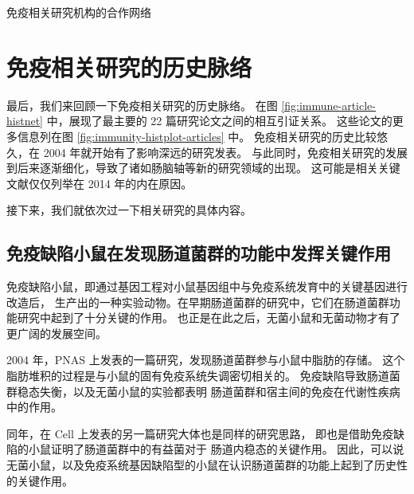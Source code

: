 \documentclass[]{ctexbook}
\begin{document}
\hypertarget{htmlwidget-6bb3423848992ed14693}{}

\label{fig:immune-article-university-collaboration-network}免疫相关研究机构的合作网络

\hypertarget{ux514dux75abux76f8ux5173ux7814ux7a76ux7684ux5386ux53f2ux8109ux7edc}{%
\section{免疫相关研究的历史脉络}\label{ux514dux75abux76f8ux5173ux7814ux7a76ux7684ux5386ux53f2ux8109ux7edc}}

最后，我们来回顾一下免疫相关研究的历史脉络。
在图 \ref{fig:immune-article-histnet} 中，展现了最主要的 22 篇研究论文之间的相互引证关系。
这些论文的更多信息列在图 \ref{fig:immunity-histplot-articles} 中。
免疫相关研究的历史比较悠久，在 2004 年就开始有了影响深远的研究发表。
与此同时，免疫相关研究的发展到后来逐渐细化，导致了诸如肠脑轴等新的研究领域的出现。
这可能是相关关键文献仅仅列举在 2014 年的内在原因。

接下来，我们就依次过一下相关研究的具体内容。

\hypertarget{ux514dux75abux7f3aux9677ux5c0fux9f20ux5728ux53d1ux73b0ux80a0ux9053ux83ccux7fa4ux7684ux529fux80fdux4e2dux53d1ux6325ux5173ux952eux4f5cux7528}{%
\subsection{免疫缺陷小鼠在发现肠道菌群的功能中发挥关键作用}\label{ux514dux75abux7f3aux9677ux5c0fux9f20ux5728ux53d1ux73b0ux80a0ux9053ux83ccux7fa4ux7684ux529fux80fdux4e2dux53d1ux6325ux5173ux952eux4f5cux7528}}

免疫缺陷小鼠，即通过基因工程对小鼠基因组中与免疫系统发育中的关键基因进行改造后，
生产出的一种实验动物。在早期肠道菌群的研究中，它们在肠道菌群功能研究中起到了十分关键的作用。
也正是在此之后，无菌小鼠和无菌动物才有了更广阔的发展空间。

2004 年，PNAS 上发表的一篇研究，发现肠道菌群参与小鼠中脂肪的存储。
这个脂肪堆积的过程是与小鼠的固有免疫系统失调密切相关的。
免疫缺陷导致肠道菌群稳态失衡，以及无菌小鼠的实验都表明
肠道菌群和宿主间的免疫在代谢性疾病中的作用\citep{backhedGutMicrobiotaEnvironmental2004}。

同年，在 Cell 上发表的另一篇研究大体也是同样的研究思路，
即也是借助免疫缺陷的小鼠证明了肠道菌群中的有益菌对于
肠道内稳态的关键作用\citep{rakoff-nahoumRecognitionCommensalMicroflora2004}。
因此，可以说无菌小鼠，以及免疫系统基因缺陷型的小鼠在认识肠道菌群的功能上起到了历史性的关键作用。
\end{document}
